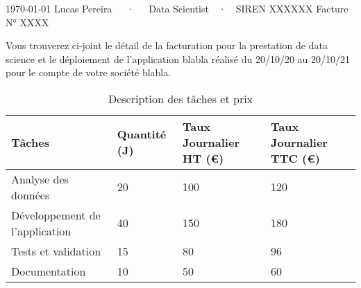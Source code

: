 \documentclass[11pt, a4paper]{awesome-cv}
\begin{document}
\makecvheader[R]

\makecvfooter
  {\today}
  {Lucas Pereira~~~·~~~Data Scientist~~·~~SIREN XXXXXX}
  {Facture N° XXXX}

\makelettertitle

\begin{cvletter}

Vous trouverez ci-joint le détail de la facturation pour la prestation de data science et le déploiement de l'application blabla réalisé du 20/10/20 au 20/10/21 pour le compte de votre société blabla.

\vspace{1cm} %

\renewcommand{\arraystretch}{1.5}
\newcommand{\tablefont}{\fontsize{10pt}{13pt}\selectfont}

\begin{table}[h!]
    \centering
    \tablefont
    \caption{Description des tâches et prix}
    \medskip
    \color{tabletext} %
    \begin{tabular}{|p{6cm}|C{3cm}|C{4cm}|C{4cm}|}
        \hline
        \rule{0pt}{2.5ex} \textbf{Tâches} & \textbf{Quantité (J)} & \textbf{Taux Journalier HT (€)} & \textbf{Taux Journalier TTC (€)} \\
        \hline
        \rule{0pt}{2.5ex} Analyse des données & 20 & 100 & 120 \\
        \hline
        \rule{0pt}{2.5ex} Développement de l'application & 40 & 150 & 180 \\
        \hline
        \rule{0pt}{2.5ex} Tests et validation & 15 & 80 & 96 \\
        \hline
        \rule{0pt}{2.5ex} Documentation & 10 & 50 & 60 \\
        \hline
    \end{tabular}
\end{table}

\vspace{1cm} %


\end{cvletter}
\end{document}
